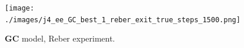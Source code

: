 \documentclass[11pt, a4paper, draft]{article}
\begin{document}
\begin{figure}
\texttt{[image: ./images/j4\_ee\_GC\_best\_1\_reber\_exit\_true\_steps\_1500.png]}
\caption{$\mathbf{GC}$ model, Reber experiment.}
\label{f:GCreber}
\end{figure}


\end{document}
